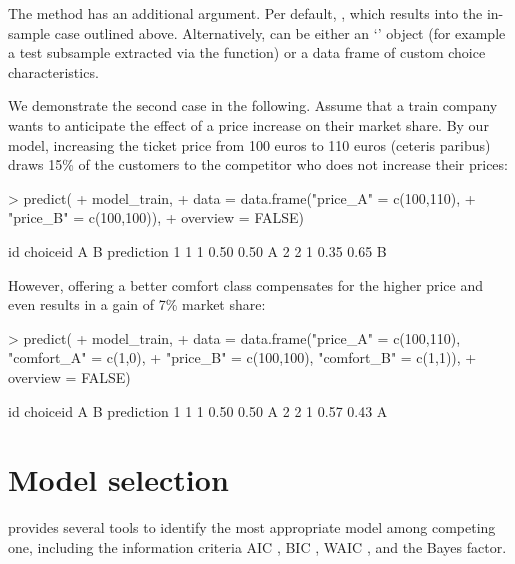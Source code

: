 \documentclass[article,shortnames]{jss}
\newcommand{\class}[1]{`\code{#1}'}
\newcommand{\fct}[1]{\code{#1()}}
\begin{document}
The \fct{predict} method has an additional  argument. Per default, , which results into the in-sample case outlined above. Alternatively,  can be either an \class{RprobitB\_data} object (for example a test subsample extracted via the \fct{train\_test} function) or a data frame of custom choice characteristics.

We demonstrate the second case in the following. Assume that a train company wants to anticipate the effect of a price increase on their market share. By our model, increasing the ticket price from 100 euros to 110 euros (ceteris paribus) draws 15\% of the customers to the competitor who does not increase their prices:

\begin{Schunk}
\begin{Sinput}
> predict(
+    model_train,
+    data = data.frame("price_A" = c(100,110),
+                      "price_B" = c(100,100)),
+    overview = FALSE)
\end{Sinput}
\begin{Soutput}
  id choiceid    A    B prediction
1  1        1 0.50 0.50          A
2  2        1 0.35 0.65          B
\end{Soutput}
\end{Schunk}

However, offering a better comfort class compensates for the higher price and even results in a gain of 7\% market share:

\begin{Schunk}
\begin{Sinput}
> predict(
+    model_train,
+    data = data.frame("price_A" = c(100,110), "comfort_A" = c(1,0),
+                      "price_B" = c(100,100), "comfort_B" = c(1,1)),
+    overview = FALSE)
\end{Sinput}
\begin{Soutput}
  id choiceid    A    B prediction
1  1        1 0.50 0.50          A
2  2        1 0.57 0.43          A
\end{Soutput}
\end{Schunk}

\section{Model selection} \label{sec:model_selection}

 provides several tools to identify the most appropriate model among competing one, including the information criteria AIC \citep{Akaike:1974}, BIC \citep{Schwarz:1978}, WAIC \citep{Watanabe:2010}, and the Bayes factor.
\end{document}
